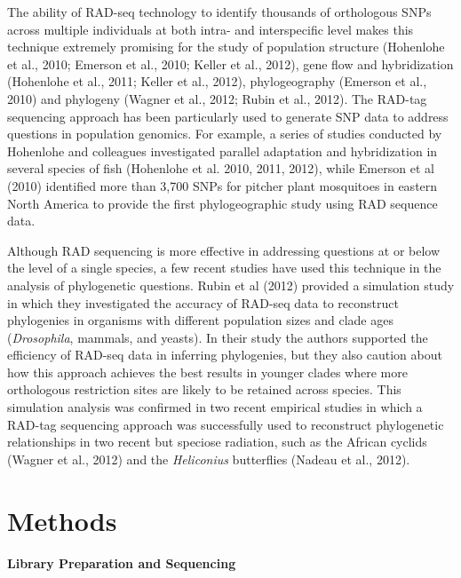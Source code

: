 \documentclass[12pt]{article}
\begin{document}
The ability of RAD-seq technology to identify thousands of orthologous SNPs across multiple individuals at both intra- and interspecific level makes this technique extremely promising for the study of population structure (Hohenlohe et al., 2010; Emerson et al., 2010; Keller et al., 2012), gene flow and hybridization (Hohenlohe et al., 2011; Keller et al., 2012), phylogeography (Emerson et al., 2010) and phylogeny (Wagner et al., 2012; Rubin et al., 2012). The RAD-tag sequencing approach has been particularly used to generate SNP data to address questions in population genomics. For example, a series of studies conducted by Hohenlohe and colleagues investigated parallel adaptation and hybridization in several species of fish (Hohenlohe et al. 2010, 2011, 2012), while Emerson et al (2010) identified more than 3,700 SNPs for pitcher plant mosquitoes in eastern North America to provide the first phylogeographic study using RAD sequence data. 

Although RAD sequencing is more effective in addressing questions at or below the level of a single species, a few recent studies have used this technique in the analysis of phylogenetic questions. Rubin et al (2012) provided a simulation study in which they investigated the accuracy of RAD-seq data to reconstruct phylogenies in organisms with different population sizes and clade ages (\emph{Drosophila}, mammals, and yeasts). In their study the authors supported the efficiency of RAD-seq data in inferring phylogenies, but they also caution about how this approach achieves the best results in younger clades where more orthologous restriction sites are likely to be retained across species. This simulation analysis was confirmed in two recent empirical studies in which a RAD-tag sequencing approach was successfully used to reconstruct phylogenetic relationships in two recent but speciose radiation, such as the African cyclids (Wagner et al., 2012) and the \emph{Heliconius} butterﬂies (Nadeau et al., 2012).

\section{Methods}

\paragraph{Library Preparation and Sequencing}
\end{document}
